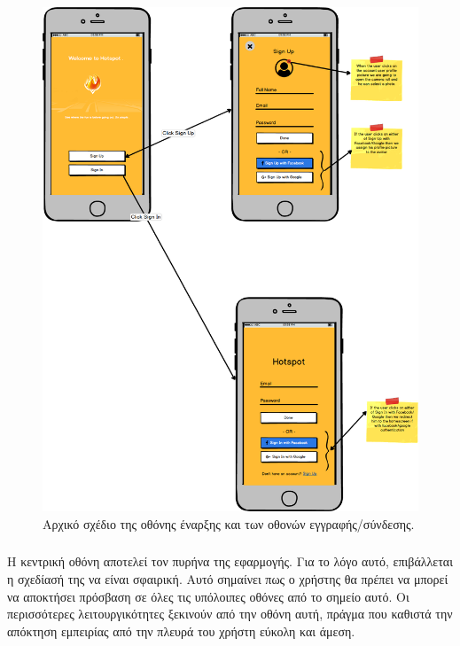 \begin{figure}[H]
    \centering
    \includegraphics[scale=0.23]{figures/sign-up-sign-in.png}
    \caption{Αρχικό σχέδιο της οθόνης έναρξης και των οθονών εγγραφής/σύνδεσης.}
    \label{authmockup}
\end{figure}

\subsubsection{}
Η κεντρική οθόνη αποτελεί τον πυρήνα της εφαρμογής. Για το λόγο αυτό, επιβάλλεται η σχεδίασή της να είναι σφαιρική. Αυτό σημαίνει πως ο χρήστης θα πρέπει να μπορεί να αποκτήσει πρόσβαση σε όλες τις υπόλοιπες οθόνες από το σημείο αυτό. Οι περισσότερες λειτουργικότητες ξεκινούν από την οθόνη αυτή, πράγμα που καθιστά την απόκτηση εμπειρίας από την πλευρά του χρήστη εύκολη και άμεση. \newline

